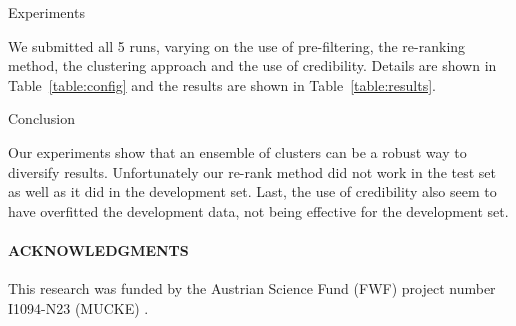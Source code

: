 \documentclass{acm_proc_article-me}
\begin{document}
\begin{section}{Experiments}

We submitted all 5 runs, varying on the use of pre-filtering, the re-ranking method, the clustering approach and the use of credibility.
Details are shown in Table~\ref{table:config} and the results are shown in Table~\ref{table:results}.

%
%
\end{section}
\begin{section}{Conclusion}

Our experiments show that an ensemble of clusters can be a robust way to diversify results.
Unfortunately our re-rank method did not work in the test set as well as it did in the development set.
Last, the use of credibility also seem to have overfitted the development data, not being effective for the development set.

\end{section}

\paragraph{\textbf{ACKNOWLEDGMENTS}}
This research was funded by the Austrian Science Fund (FWF) project number I1094-N23 (MUCKE) .


  
\end{document}
